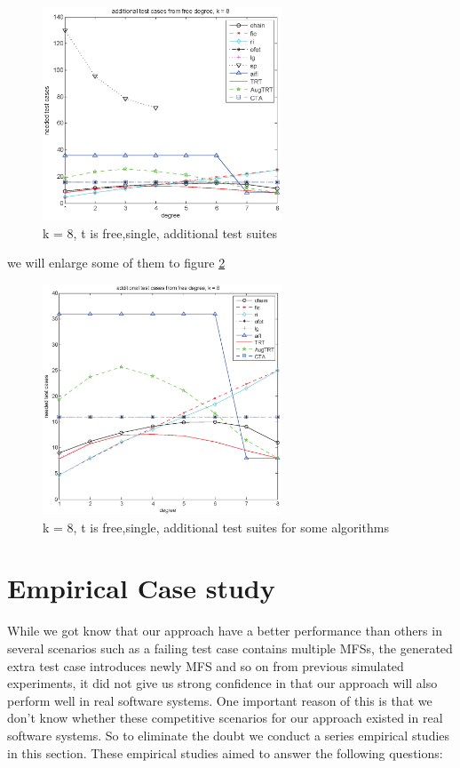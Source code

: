 \documentclass[10pt,journal,cspaper,compsoc]{IEEEtran}
\begin{document}
\begin{figure}
 \centering
 \includegraphics[width=2.8in]{freeD.eps}
 \caption{k = 8, t is free,single, additional test suites}
 \label{fig_free_d}
\end{figure}

we will enlarge some of them to figure \ref{fig_free_d_small}

\begin{figure}
 \centering
 \includegraphics[width=2.8in]{freeD2.eps}
 \caption{k = 8, t is free,single, additional test suites for some algorithms}
 \label{fig_free_d_small}
\end{figure}


\section{Empirical Case study}\label{sec:realEx}
 While we got know that our approach have a better performance than others in several scenarios such as a failing test case contains multiple MFSs, the generated extra test case introduces newly MFS and so on from previous simulated experiments, it did not give us strong confidence in that our approach will also perform well in real software systems. One important reason of this is that we don't know whether these competitive scenarios for our approach existed in real software systems. So to eliminate the doubt we conduct a series empirical studies in this section. These empirical studies aimed to answer the following questions:
\end{document}
